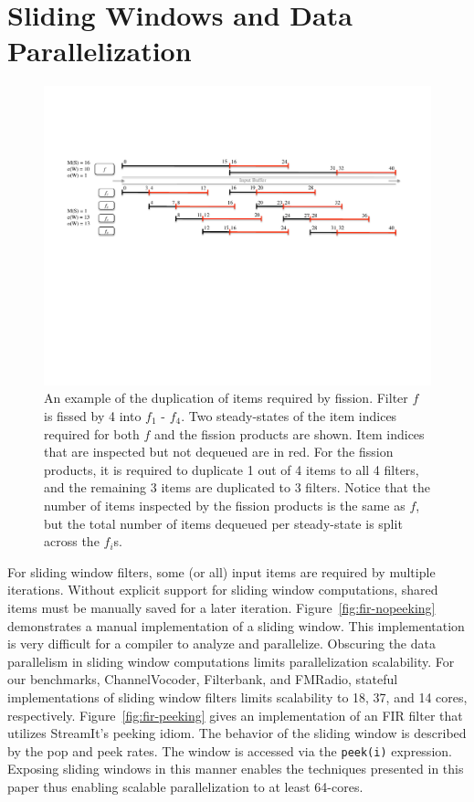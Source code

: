 \section{Sliding Windows and Data Parallelization}

\begin{figure}[t]
\centering
\includegraphics[width=6.0in]{figures/fission-sharing.pdf}
\caption[An example of the sharing required by fission.]  { An
  example of the duplication of items required by fission.  Filter $f$
  is fissed by 4 into $f_1$ - $f_4$.  Two steady-states of the item
  indices required for both $f$ and the fission products are shown.
  Item indices that are inspected but not dequeued are in red.  For the
  fission products, it is required to duplicate 1 out of 4 items to
  all 4 filters, and the remaining 3 items are duplicated to 3
  filters.  Notice that the number of items inspected by the fission
  products is the same as $f$, but the total number of items dequeued 
per steady-state is split across the $f_i$s.
\label{fig:fission-sharing}}
\end{figure}


For sliding window filters, some (or all) input items are required by
multiple iterations.  Without explicit support for sliding window
computations, shared items must be manually saved for a later
iteration.  Figure~\ref{fig:fir-nopeeking} demonstrates a manual
implementation of a sliding window.  This implementation is very
difficult for a compiler to analyze and parallelize.  Obscuring the
data parallelism in sliding window computations limits parallelization
scalability.  For our benchmarks, ChannelVocoder, Filterbank, and
FMRadio, stateful implementations of sliding window filters limits
scalability to 18, 37, and 14 cores, respectively.
Figure~\ref{fig:fir-peeking} gives an implementation of an FIR filter
that utilizes StreamIt's peeking idiom.  The behavior of the sliding
window is described by the pop and peek rates.  The window is accessed
via the {\tt peek(i)} expression.  Exposing sliding windows in this
manner enables the techniques presented in this paper thus enabling
scalable parallelization to at least 64-cores.

